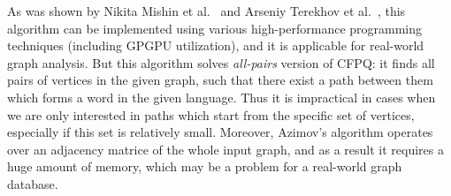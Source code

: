As was shown by Nikita Mishin et al.~\cite{Mishin:2019:ECP:3327964.3328503} and Arseniy Terekhov et al.~\cite{ 10.1145/3398682.3399163}, this algorithm can be implemented using various high-performance programming techniques (including GPGPU utilization), and it is applicable for real-world graph analysis.
But this algorithm solves \textit{all-pairs} version of CFPQ: it finds all pairs of vertices in the given graph, such that there exist a path between them which forms a word in the given language.
Thus it is impractical in cases when we are only interested in paths which start from the specific set of vertices, especially if this set is relatively small.
Moreover, Azimov's algorithm operates over an adjacency matrice of the whole input graph, and as a result it requires a huge amount of memory, which may be a problem for a real-world graph database.
